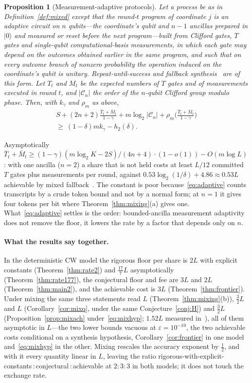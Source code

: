 \documentclass[aps,prx,twocolumn,superscriptaddress,nofootinbib,longbibliography]{revtex4-2}
\theoremstyle{plain}
\newtheorem{proposition}{Proposition}
\theoremstyle{definition}
\theoremstyle{remark}
\begin{document}
\begin{proposition}[Measurement-adaptive protocols]\label{prop:adaptive}
Let a process be as in Definition~\ref{def:mixed} except that the round-$t$ program of coordinate $j$ is an adaptive circuit on $n$ qubits---the coordinate's qubit and $n-1$ ancillas prepared in $|0\rangle$ and measured or reset before the next program---built from Clifford gates, $T$ gates and single-qubit computational-basis measurements, in which each gate may depend on the outcomes obtained earlier in the same program, and such that on every outcome branch of nonzero probability the operation induced on the coordinate's qubit is unitary. Repeat-until-success and fallback synthesis~\cite{BRS,KLMPP} are of this form. Let $T_t$ and $M_t$ be the expected numbers of $T$ gates and of measurements executed in round $t$, and $|\mathcal C_n|$ the order of the $n$-qubit Clifford group modulo phase. Then, with $k_\gamma$ and $\rho_m$ as above,
\begin{multline}\label{eq:adaptive}
S+(2n+2)\frac{\bar T_t+\bar M_t}{1-\gamma}+m\log_2|\mathcal C_n|+\rho_m\Big(\frac{\bar T_t+\bar M_t}{1-\gamma}\Big)\\ \ge\ (1-\delta)mk_\gamma-h_2(\delta).
\end{multline}
\end{proposition}
Asymptotically $\bar T_t+\bar M_t\ge(1-\gamma)(m\log_2K-2S)/(4n+4)\cdot(1-o(1))-O(m\log L)$: with one ancilla ($n=2$) a share that is not held costs at least $L/12$ committed $T$ gates plus measurements per round, against $0.53\log_2(1/\delta)+4.86\approx0.53L$ achievable by mixed fallback~\cite[Eq.~(13)]{KLMPP,Bothe}. The constant is poor because~\eqref{eq:adaptive} counts transcripts by a crude token bound and not by a normal form; at $n=1$ it gives four tokens per bit where Theorem~\ref{thm:mixing}(a) gives one. What~\eqref{eq:adaptive} settles is the order: bounded-ancilla measurement adaptivity does not remove the floor, it lowers the rate by a factor that depends only on $n$.

\paragraph{What the results say together.} In the deterministic CW model the rigorous floor per share is $2L$ with explicit constants (Theorem~\ref{thm:rate2}) and $\tfrac{17}7L$ asymptotically (Theorem~\ref{thm:rate177}), the conjectural floor and fee are $3L$ and $2L$ (Theorem~\ref{thm:main2}), and the achievable cost is $3L$ (Theorem~\ref{thm:frontier}). Under mixing the same three statements read $L$ (Theorem~\ref{thm:mixing}(b)), $\tfrac32L$ and $L$ (Corollary~\ref{cor:mixq}, under the same Conjecture~\ref{conj:H}) and $\tfrac32L$ (Proposition~\ref{prop:mixach} under~\eqref{eq:mixhyp}; $1.52L$ measured in~\cite{KLMPP}), all of them asymptotic in $L$---the two lower bounds vacuous at $\varepsilon=10^{-10}$, the two achievable costs conditional on a synthesis hypothesis, Corollary~\ref{cor:frontier} in one model and~\eqref{eq:mixhyp} in the other. Mixing rescales the accuracy exponent by $\tfrac12$, and with it every quantity linear in $L$, leaving the ratio rigorous-with-explicit-constants\,:\,conjectural\,:\,achievable at $2:3:3$ in both models; it does not touch the exchange rate.
\end{document}

